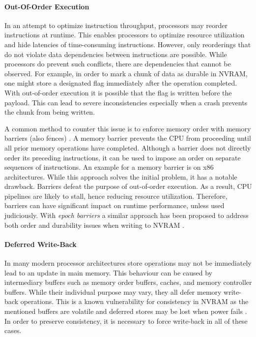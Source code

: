 \paragraph{Out-Of-Order Execution}

In an attempt to optimize instruction throughput, processors may reorder
instructions at runtime. This enables processors to optimize resource
utilization and hide latencies of time-consuming instructions. However, only
reorderings that do not violate data dependencies between instructions are
possible. While processors do prevent such conflicts, there are dependencies
that cannot be observed. For example, in order to mark a chunk of data as
durable in NVRAM, one might store a designated flag immediately after the
operation completed. With out-of-order execution it is possible that the flag
is written before the payload. This can lead to severe inconsistencies
especially when a crash prevents the chunk from being written.

A common method to counter this issue is to enforce memory order with memory
barriers (also fences) \cite{dulloor2014system, schwalb2016hyrise,
oukid2017data}. A memory barrier prevents the CPU from proceeding until all
prior memory operations have completed. Although a barrier does not directly
order its preceding instructions, it can be used to impose an order on separate
sequences of instructions. An example for a memory barrier is  on
x86 architectures. While this approach solves the initial problem, it has a
notable drawback. Barriers defeat the purpose of out-of-order execution. As a
result, CPU pipelines are likely to stall, hence reducing resource utilization.
Therefore, barriers can have significant impact on runtime performance, unless
used judiciously. With \emph{epoch barriers} a similar approach has been
proposed to address both order and durability issues when writing to NVRAM
\cite{condit2009better}.

\paragraph{Deferred Write-Back}

In many modern processor architectures store operations may not  be immediately
lead to an update in main memory. This behaviour can be caused by intermediary
buffers such as memory order buffers, caches, and memory controller buffers.
While their individual purpose may vary, they all defer memory write-back
operations. This is a known vulnerability for consistency in NVRAM as the
mentioned buffers are volatile and deferred stores may be lost when power fails
\cite{condit2009better, oukid2017data}. In order to preserve consistency, it is
necessary to force write-back in all of these cases.

